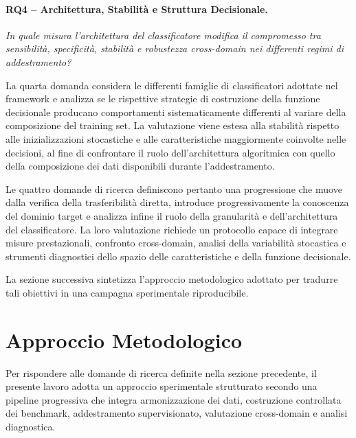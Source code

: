 \paragraph{RQ4 -- Architettura, Stabilità e Struttura Decisionale.}
\textit{In quale misura l'architettura del classificatore modifica il compromesso tra sensibilità, specificità, stabilità e robustezza cross-domain nei differenti regimi di addestramento?}

La quarta domanda considera le differenti famiglie di classificatori adottate nel framework e analizza se le rispettive strategie di costruzione della funzione decisionale producano comportamenti sistematicamente differenti al variare della composizione del training set. 
La valutazione viene estesa alla stabilità rispetto alle inizializzazioni stocastiche e alle caratteristiche maggiormente coinvolte nelle decisioni, al fine di confrontare il ruolo dell'architettura algoritmica con quello della composizione dei dati disponibili durante l'addestramento.

Le quattro domande di ricerca definiscono pertanto una progressione che muove dalla verifica della trasferibilità diretta, introduce progressivamente la conoscenza del dominio target e analizza infine il ruolo della granularità e dell'architettura del classificatore. 
La loro valutazione richiede un protocollo capace di integrare misure prestazionali, confronto cross-domain, analisi della variabilità stocastica e strumenti diagnostici dello spazio delle caratteristiche e della funzione decisionale.

La sezione successiva sintetizza l'approccio metodologico adottato per tradurre tali obiettivi in una campagna sperimentale riproducibile.




\section{Approccio Metodologico}
\label{sec:intro_approccio}

Per rispondere alle domande di ricerca definite nella sezione precedente, il presente lavoro adotta un approccio sperimentale strutturato secondo una pipeline progressiva che integra armonizzazione dei dati, costruzione controllata dei benchmark, addestramento supervisionato, valutazione cross-domain e analisi diagnostica.

